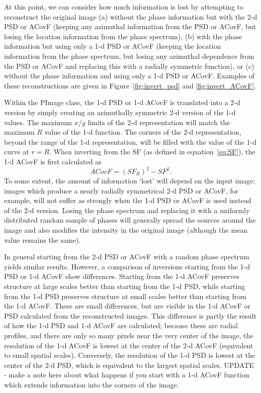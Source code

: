 \documentclass[11pt,preprint]{aastex}
\begin{document}
At this point, we can consider how much information is lost by attempting to reconstruct the original image (a) without the phase information but with the 2-d PSD or ACovF (keeping any azimuthal information from the PSD or ACovF, but losing the location information from the phase spectrum), (b) with the phase information but using only a 1-d PSD or ACovF (keeping the location information from the phase spectrum, but losing any azimuthal dependence from the PSD or ACovF and replacing this with a radially symmetric function), or (c) without the phase information and using only a 1-d PSD or ACovF.  Examples of these reconstructions are given in Figure~\ref{fig:invert_psd} and \ref{fig:invert_ACovF}. 

Within the PImage class, the 1-d PSD or 1-d ACovF is translated into a 2-d version by simply creating an azimuthally symmetric 2-d version of the 1-d values. The maximum $x/y$ limits of the 2-d representation will match the maximum $R$ value of the 1-d  function. The corners of the 2-d representation, beyond the range of the 1-d representation, will be filled with the value of the 1-d curve at $r=R$.  When inverting from the SF (as defined in equation~\ref{eq:SF}), the 1-d ACovF is first calculated as 
\begin{equation}
ACovF = (SF_R)^2 - SF^2.
\end{equation}
To some extent, the amount of information `lost' will depend on the input image; images which produce a nearly radially symmetrical 2-d PSD or ACovF, for example, will not suffer as strongly when the 1-d PSD or ACovF is used instead of the 2-d version. Losing the phase spectrum and replacing it with a uniformly distributed random sample of phases will generally spread the sources around the image and also modifies the intensity in the original image (although the mean value remains the same). 

In general starting from the 2-d PSD or ACovF with a random phase spectrum yields similar results. However, a comparison of inversions starting from the 1-d PSD or 1-d ACovF show differences. Starting from the 1-d ACovF preserves structure at large scales better than starting from the 1-d PSD, while starting from the 1-d PSD preserves structure at small scales better than starting from the 1-d ACovF. These are small differences, but are visible in the 1-d ACovF or PSD calculated from the reconstructed images.  This difference is partly the result of how the 1-d PSD and 1-d ACovF are calculated; because these are radial profiles, and there are only so many pixels near the very center of the image, the resolution of the 1-d ACovF is lowest at the center of the 2-d ACovF (equivalent to small spatial scales). Conversely, the resolution of the 1-d PSD is lowest at the center of the 2-d PSD, which is equivalent to the largest spatial scales. UPDATE - make a note here about what happens if you start with a 1-d ACovF function which extends information into the corners of the image.
\end{document}
